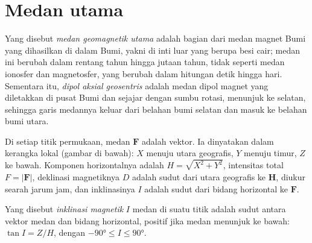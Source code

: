 \section{Medan utama}

\begin{definition}\label{def:b3:palaeomagnetism:main-field}
Yang disebut \emph{medan geomagnetik utama} adalah bagian dari
medan magnet Bumi yang dihasilkan di dalam Bumi, yakni di inti luar
yang berupa besi cair; medan ini berubah dalam rentang tahun hingga jutaan tahun, tidak seperti
medan ionosfer dan magnetosfer, yang berubah dalam hitungan detik hingga hari. Sementara itu,
\emph{dipol aksial geosentris} adalah medan dipol magnet
yang diletakkan di pusat Bumi dan sejajar dengan sumbu rotasi,
menunjuk ke selatan, sehingga garis medannya keluar dari belahan bumi selatan dan
masuk ke belahan bumi utara.
\end{definition}

Di setiap titik permukaan, medan $\mathbf F$ adalah vektor. Ia dinyatakan
dalam kerangka lokal (gambar di bawah): $X$ menuju utara geografis, $Y$ menuju
timur, $Z$ ke bawah. Komponen horizontalnya adalah $H = \sqrt{X^2 + Y^2}$,
intensitas total $F = |\mathbf F|$, deklinasi magnetiknya $D$ adalah sudut dari
utara geografis ke $\mathbf H$, diukur searah jarum jam, dan inklinasinya $I$ adalah
sudut dari bidang horizontal ke $\mathbf F$.

\begin{definition}\label{def:b3:palaeomagnetism:inclination}
Yang disebut \emph{inklinasi magnetik} $I$ medan di suatu
titik adalah sudut antara vektor medan dan bidang horizontal, positif jika medan
menunjuk ke bawah: $\tan I = Z/H$, dengan $-\ang{90} \le I
\le \ang{90}$.
\end{definition}

